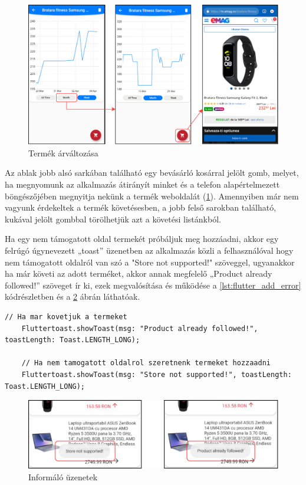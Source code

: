 \begin{figure}[H]
    \centering
    \includegraphics[scale=1]{figures/images/flutter_chart.png}
    \caption{Termék árváltozása}
    \label{fig:flutter_chart}
\end{figure}

Az ablak jobb alsó sarkában található egy bevásárló kosárral jelölt gomb, melyet, ha megnyomunk az alkalmazás átirányít minket és a telefon alapértelmezett böngészőjében megnyitja nekünk a termék weboldalát (\ref{fig:flutter_chart}). Amennyiben már nem vagyunk érdekeltek a termék követésesben, a jobb felső sarokban található, kukával jelölt gombbal törölhetjük azt a követési listánkból.

Ha egy nem támogatott oldal termekét próbáljuk meg hozzáadni, akkor egy felrúgó úgynevezett „toast” üzenetben az alkalmazás közli a felhasználóval hogy nem támogatott oldalról van szó a "Store not supported!" szöveggel, ugyanakkor ha már követi az adott terméket, akkor annak megfelelő „Product already followed!” szöveget ír ki, ezek megvalósítása és működése a \ref{lst:flutter_add_error} kódrészletben és a  \ref{fig:flutter_add_error} ábrán láthatóak.

\begin{lstlisting}[caption={Informáló üzeneteket megjelenítő függvények}, label={lst:flutter_add_error}, basicstyle=\footnotesize]
    // Ha mar kovetjuk a termeket
    Fluttertoast.showToast(msg: "Product already followed!", toastLength: Toast.LENGTH_LONG);

    // Ha nem tamogatott oldalrol szeretnenk termeket hozzaadni
    Fluttertoast.showToast(msg: "Store not supported!", toastLength: Toast.LENGTH_LONG);
\end{lstlisting}

\begin{figure}[H]
    \centering
    \includegraphics[scale=1]{figures/images/flutter_add_error.png}
    \caption{Informáló üzenetek}
    \label{fig:flutter_add_error}
\end{figure}

